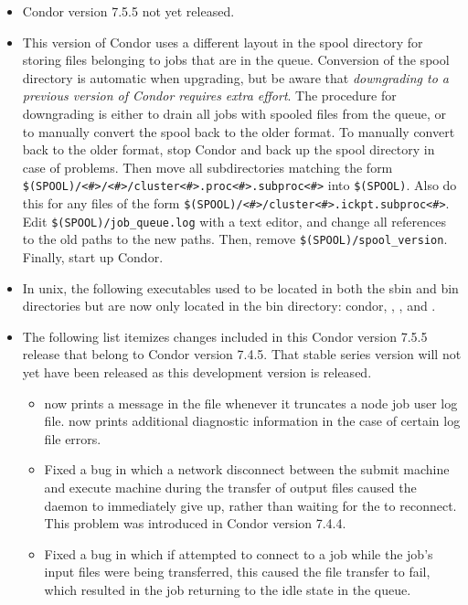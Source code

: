 \begin{itemize}

\item Condor version 7.5.5 not yet released.

\item This version of Condor uses a different layout in the spool
  directory for storing files belonging to jobs that are in the queue.
  Conversion of the spool directory is automatic when upgrading, but
  be aware that \emph{downgrading to a previous version of Condor
  requires extra effort}.  The procedure for downgrading is either
  to drain all jobs with spooled files from the queue, or to manually
  convert the spool back to the older format.  To manually convert
  back to the older format, stop Condor and back up the spool directory
  in case of problems.  Then move all subdirectories matching the form
  \verb|$(SPOOL)/<#>/<#>/cluster<#>.proc<#>.subproc<#>| into
  \verb|$(SPOOL)|.  Also do this for any files of the form
  \verb|$(SPOOL)/<#>/cluster<#>.ickpt.subproc<#>|.  Edit
  \verb|$(SPOOL)/job_queue.log| with a text editor, and change all
  references to the old paths to the new paths.  Then, remove
  \verb|$(SPOOL)/spool_version|.  Finally, start up Condor.

\item In unix, the following executables used to be located in both
  the sbin and bin directories but are now only located in the bin
  directory: condor, , , and
  .

\item The following list itemizes changes included in this Condor version
  7.5.5 release that belong to Condor version 7.4.5.  That stable series
  version will not yet have been released as this development version 
  is released.
  \begin{itemize}

  \item {} now prints a message in the  file
  whenever it truncates a node job user log file.
   now prints additional diagnostic information in the
  case of certain log file errors.

  \item Fixed a bug in which
  a network disconnect between the submit machine and execute
  machine during the transfer of output files caused the
   daemon to immediately give up, rather than waiting
  for the  to reconnect.  This problem was introduced
  in Condor version 7.4.4.

  \item Fixed a bug in which
  if  attempted to connect to a job while the
  job's input files were being transferred, this caused the file
  transfer to fail, which resulted in the job returning to the idle
  state in the queue.

  \end{itemize}
\end{itemize}


